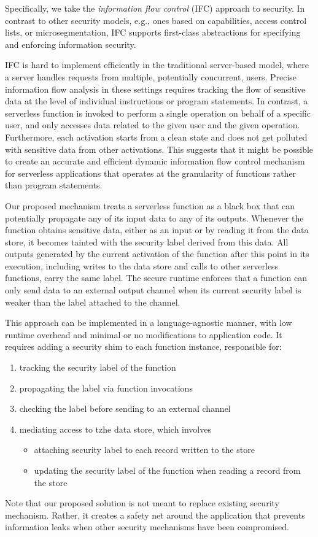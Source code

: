 Specifically, we take the \emph{information flow control} (IFC) 
approach to security. In contrast to other security models, e.g., ones 
based on capabilities, access control lists, or microsegmentation, IFC 
supports first-class abstractions for specifying and enforcing 
information security.

IFC is hard to implement efficiently in the traditional server-based 
model, where a server handles requests from multiple, potentially 
concurrent, users. Precise information flow analysis in these settings 
requires tracking the flow of sensitive data at the level of 
individual instructions or program statements.  In contrast, a 
serverless function is invoked to perform a single operation on behalf 
of a specific user, and only accesses data related to the given user 
and the given operation. Furthermore, each activation starts from a 
clean state and does not get polluted with sensitive data from other 
activations. This suggests that it might be possible to create an 
accurate and efficient dynamic information flow control mechanism for 
serverless applications that operates at the granularity of functions 
rather than program statements.

Our proposed mechanism treats a serverless function as a black box 
that can potentially propagate any of its input data to any of its 
outputs. Whenever the function obtains sensitive data, either as an 
input or by reading it from the data store, it becomes tainted with 
the security label derived from this data. All outputs generated by 
the current activation of the function after this point in its 
execution, including writes to the data store and calls to other 
serverless functions, carry the same label. The secure runtime 
enforces that a function can only send data to an external output 
channel when its current security label is weaker than the label 
attached to the channel.

This approach can be implemented in a language-agnostic manner, with 
low runtime overhead and minimal or no modifications to application 
code. It requires adding a security shim to each function instance, 
responsible for:

\begin{enumerate}
    \item tracking the security label of the function

    \item propagating the label via function invocations

    \item checking the label before sending to an external channel

    \item mediating access to tzhe data store, which involves
        \begin{itemize}
            \item attaching security label to each record written to 
                the store
            \item updating the security label of the function when 
                reading a record from the store
        \end{itemize}
\end{enumerate}

Note that our proposed solution is not meant to replace existing 
security mechanism. Rather, it creates a safety net around the 
application that prevents information leaks when other security 
mechanisms have been compromised.  

